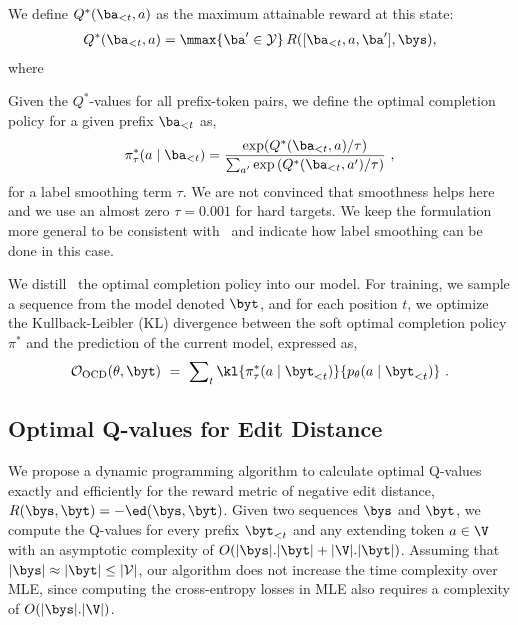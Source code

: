 {{We define $Q^*(\ba_{<t}, a)$ as the maximum attainable reward at this state:
\begin{align}
    Q^*(\ba_{<t}, a) = \mmax{\ba' \in \mathcal{Y}} \,R([\ba_{<t}, a, \ba'], \bys),
\label{eq:reward}
\end{align}
where
}

Given the $Q^*$-values for all prefix-token pairs, we define the
optimal completion policy for a given prefix $\ba_{<t}$ as,
\begin{align}
    \pi_\tau^*(a \mid \ba_{<t}) = \frac{\exp ({Q^*(\ba_{<t}, a)}/\tau)}{\sum_{a'} \exp {(Q^*(\ba_{<t}, a')/\tau)}}~,
\end{align}
for a label smoothing term $\tau$.  We are not
convinced that smoothness helps here and we use an almost zero $\tau = 0.001$ for hard targets. We keep the formulation more general to be consistent with~\citep{rusu-iclr-2016} and indicate how label smoothing can be done in this case. 

We distill~\citep{hinton-nips-2014}
the optimal completion policy  into our  model.
For training, we sample a sequence from the model denoted $\byt$, and for each position $t$, we optimize
the Kullback-Leibler (KL) divergence between the soft optimal
completion policy $\pi^*$ and the prediction of the current model, expressed as,
\begin{equation}
 \mathcal{O}_{\text{OCD}}(\theta, \byt) ~=~ \sum\nolimits_t \kl{\pi_\tau^*(a \mid \byt_{<t})}{p_\theta(a \mid \byt_{<t})}~.
\end{equation}

}

\vspace*{-.2cm}
\subsection{Optimal Q-values for Edit Distance}
\vspace*{-.1cm}
\label{sec:oced}

We propose a dynamic programming algorithm to calculate optimal
Q-values exactly and efficiently for the reward metric of negative edit distance,
\ie~$R(\bys,\byt) = -\ed(\bys,\byt)$. Given two sequences $\bys$ and $\byt$, we compute the Q-values for
every prefix $\byt_{<t}$ and any extending token $a \in \V$ with an asymptotic complexity of $O(|\bys|.|\byt| + |\V|.|\byt|)$.
Assuming that $|\bys| \approx |\byt| \leq |\mathcal{V}|$, our algorithm does not increase the time
complexity over MLE, since %
computing the cross-entropy losses in MLE also requires
a complexity of $O(|\bys|.|\V|)$. 

